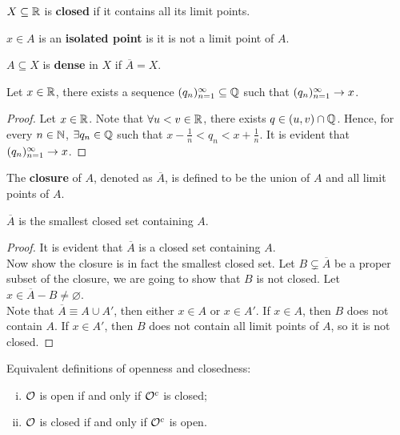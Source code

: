 \documentclass[11pt]{article}
\begin{document}
	\begin{definition}
		$X \subseteq \mathbb{R}$ is \textbf{closed} if it contains all its limit points.
	\end{definition}
	
	\begin{definition}
		$x \in A$ is an \textbf{isolated point} is it is not a limit point of $A$.
	\end{definition}
	
	\begin{definition}
		$A \subseteq X$ is \textbf{dense} in $X$ if $\overline{A} = X$.
	\end{definition}
	
	\begin{theorem}
		Let $x \in \mathbb{R}$, there exists a sequence $({q}_{n})_{{n}=1}^\infty \subseteq \mathbb{Q}$ such that $({q}_{n})_{{n}=1}^\infty \to x$.
	\end{theorem}
	
	\begin{proof}
		Let $x \in \mathbb{R}$. Note that $\forall u < v \in \mathbb{R}$, there exists $q \in (u, v) \cap \mathbb{Q}$.
		Hence, for every $n \in \mathbb{N}$, $\exists q_n \in \mathbb{Q}$ such that $x - \frac{1}{n} < q_n < x + \frac{1}{n}$. It is evident that $({q}_{n})_{{n}=1}^\infty \to x$.
	\end{proof}
	
	\begin{definition}
		The \textbf{closure} of $A$, denoted as $\overline{A}$, is defined to be the union of $A$ and all limit points of $A$.
	\end{definition}
	
	\begin{lemma}
		$\overline{A}$ is the smallest closed set containing $A$.
	\end{lemma}
	\begin{proof}
		It is evident that $\overline{A}$ is a closed set containing $A$. \\
		Now show the closure is in fact the smallest closed set. Let $B \subsetneq \overline{A}$ be a proper subset of the closure, we are going to show that $B$ is not closed. Let $x \in \overline{A} - B \neq \varnothing$.\\
		Note that $\overline{A} \equiv A \cup A'$, then either $x \in A$ or $x \in A'$. If $x \in A$, then $B$ does not contain $A$. If $x \in A'$, then $B$ does not contain all limit points of $A$, so it is not closed.
	\end{proof}
	
	\begin{theorem} Equivalent definitions of openness and closedness:
		\begin{enumerate}[(i)]
			\item $\mathcal{{O}}$ is open if and only if $\mathcal{{O}}^c$ is closed;
			\item $\mathcal{{O}}$ is closed if and only if $\mathcal{{O}}^c$ is open.
		\end{enumerate}
	\end{theorem}
	
\end{document}
